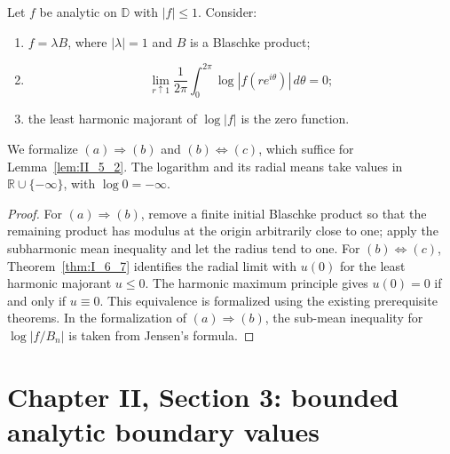 \begin{theorem}
  \label{thm:II_2_4}
  \leanok
  \mainline
  Let $f$ be analytic on $\mathbb D$ with $|f|\le1$. Consider:
  \begin{enumerate}
    \item[(a)] $f=\lambda B$, where $|\lambda|=1$ and $B$ is a Blaschke product;
    \item[(b)]
      \[
        \lim_{r\uparrow1}\frac{1}{2\pi}\int_0^{2\pi}
          \log|f(r e^{i\theta})|\,d\theta=0;
      \]
    \item[(c)] the least harmonic majorant of $\log|f|$ is the zero function.
  \end{enumerate}
  We formalize $(a)\Rightarrow(b)$ and $(b)\Leftrightarrow(c)$, which suffice for
  Lemma~\ref{lem:II_5_2}. The logarithm and its radial means take values in
  $\mathbb R\cup\{-\infty\}$, with $\log0=-\infty$.
  \begin{proof}
    \leanok
    For $(a)\Rightarrow(b)$, remove a finite initial Blaschke product so that
    the remaining product has modulus at the origin arbitrarily close to one;
    apply the subharmonic mean inequality and let the radius tend to one.
    For $(b)\Leftrightarrow(c)$, Theorem~\ref{thm:I_6_7} identifies the radial
    limit with $u(0)$ for the least harmonic majorant $u\le0$.
    The harmonic maximum principle gives $u(0)=0$ if and only if $u\equiv0$.
    This equivalence is formalized using the existing prerequisite theorems.
    In the formalization of $(a)\Rightarrow(b)$, the sub-mean inequality
    for $\log|f/B_n|$ is taken from Jensen's formula.
  \end{proof}
\end{theorem}

\section{Chapter II, Section 3: bounded analytic boundary values}

